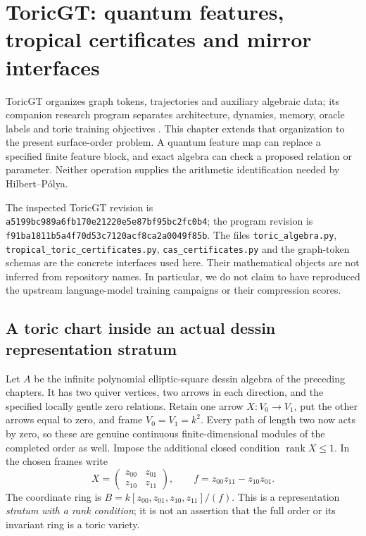 \chapter[ToricGT and mirror interfaces]{ToricGT: quantum features, tropical certificates and mirror interfaces}
\label{tg:chapter}

ToricGT organizes graph tokens, trajectories and auxiliary algebraic data; its
companion research program separates architecture, dynamics, memory, oracle
labels and toric training objectives \cite{TGTCode,TGTProgram}. This chapter
extends that organization to the present surface-order problem. A quantum
feature map can replace a specified finite feature block, and exact algebra
can check a proposed relation or parameter. Neither operation supplies the
arithmetic identification needed by Hilbert--P\'olya.

The inspected ToricGT revision is
\texttt{a5199bc989a6fb170e21220e5e87bf95bc2fc0b4}; the program revision is
\texttt{f91ba1811b5a4f70d53c7120acf8ca2a0049f85b}.
The files \texttt{toric\_algebra.py},
\texttt{tropical\_toric\_certificates.py},
\texttt{cas\_certificates.py} and the graph-token schemas are the concrete
interfaces used here. Their mathematical objects are not inferred from
repository names. In particular, we do not claim to have reproduced the
upstream language-model training campaigns or their compression scores.

\section{A toric chart inside an actual dessin representation stratum}
Let $A$ be the infinite polynomial elliptic-square dessin algebra of the
preceding chapters. It has two quiver vertices, two arrows in each direction,
and the specified locally gentle zero relations. Retain one arrow
$X:V_0\to V_1$, put the other arrows equal to zero, and frame
$V_0=V_1=k^2$. Every path of length two now acts by zero, so these are genuine
continuous finite-dimensional modules of the completed order as well.
Impose the additional closed condition $\operatorname{rank}X\leq1$.
In the chosen frames write
\[
 X=\begin{pmatrix}z_{00}&z_{01}\\z_{10}&z_{11}\end{pmatrix},\qquad
 f=z_{00}z_{11}-z_{10}z_{01}.
\]
The coordinate ring is $B=k[z_{00},z_{01},z_{10},z_{11}]/(f)$.
This is a representation \emph{stratum with a rank condition}; it is not an
assertion that the full order or its invariant ring is a toric variety.

